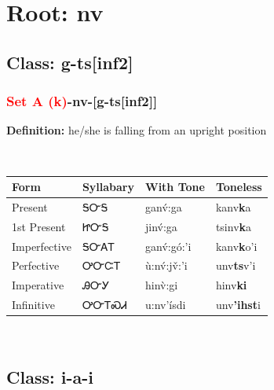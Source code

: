 \needspace{4in}
\section*{Root: nv}
\nopagebreak
{}
\needspace{3in}
\subsection*{Class: g-ts[inf2]}
\nopagebreak
\needspace{2in}
\subsubsection*{\textcolor{Red}{Set A (k)}{-}\textbf{nv}{-}[g-ts[inf2]]}
\nopagebreak
\textbf{Definition: } he/she is falling from an upright position
\\[0.5em]
\begin{tabularx}{\textwidth}{l X X X}%
\toprule%
\textbf{Form}&\textbf{Syllabary}&\textbf{With Tone}&\textbf{Toneless}\\%
\midrule%
Present&ᎦᏅᎦ&ganv́:ga&kanv\textbf{k}a\\%
1st Present&ᏥᏅᎦ&jinv́:ga&tsinv\textbf{k}a\\%
Imperfective&ᎦᏅᎪᎢ&ganv́:gó:’i&kanv\textbf{k}o'i\\%
Perfective&ᎤᏅᏨᎢ&ù:nv́:jv̌:’i&unv\textbf{ts}v'i\\%
Imperative&ᎯᏅᎩ&hinv̀:gi&hinv\textbf{ki}\\%
Infinitive&ᎤᏅᎢᏍᏗ&u:nv’ísdi&unv\textbf{'ihst}i\\%
\bottomrule%
\end{tabularx}
\\[1em]
\needspace{3in}
\subsection*{Class: i-a-i}
\nopagebreak
\needspace{2in}
